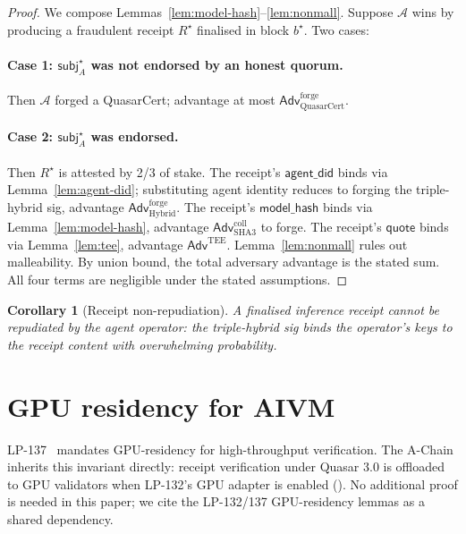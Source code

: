 \documentclass[11pt]{article}
\newtheorem{corollary}[theorem]{Corollary}
\begin{document}
\begin{proof}
We compose Lemmas~\ref{lem:model-hash}--\ref{lem:nonmall}. Suppose
$\mathcal{A}$ wins by producing a fraudulent receipt $R^\star$
finalised in block $b^\star$. Two cases:

\paragraph{Case 1: $\mathsf{subj}_A^\star$ was not endorsed by an
honest quorum.}
Then $\mathcal{A}$ forged a QuasarCert; advantage at most
$\mathsf{Adv}^{\mathrm{forge}}_{\mathrm{QuasarCert}}$.

\paragraph{Case 2: $\mathsf{subj}_A^\star$ was endorsed.}
Then $R^\star$ is attested by 2/3 of stake. The receipt's
$\mathsf{agent\_did}$ binds via Lemma~\ref{lem:agent-did}; substituting
agent identity reduces to forging the triple-hybrid sig, advantage
$\mathsf{Adv}^{\mathrm{forge}}_{\mathrm{Hybrid}}$.
The receipt's $\mathsf{model\_hash}$ binds via
Lemma~\ref{lem:model-hash}, advantage
$\mathsf{Adv}^{\mathrm{coll}}_{\mathrm{SHA3}}$ to forge.
The receipt's $\mathsf{quote}$ binds via Lemma~\ref{lem:tee},
advantage $\mathsf{Adv}^{\mathrm{TEE}}$.
Lemma~\ref{lem:nonmall} rules out malleability.
By union bound, the total adversary advantage is the stated sum.
All four terms are negligible under the stated assumptions.
\end{proof}

\begin{corollary}[Receipt non-repudiation]
\label{cor:nonrep}
A finalised inference receipt cannot be repudiated by the agent
operator: the triple-hybrid sig binds the operator's keys to the
receipt content with overwhelming probability.
\end{corollary}

\section{GPU residency for AIVM}
\label{sec:gpu}

LP-137~\cite{lp137} mandates GPU-residency for high-throughput
verification. The A-Chain inherits this invariant directly: receipt
verification under Quasar 3.0 is offloaded to GPU validators when
LP-132's GPU adapter is enabled (\cite{lp132}). No additional proof
is needed in this paper; we cite the LP-132/137 GPU-residency lemmas
as a shared dependency.
\end{document}

